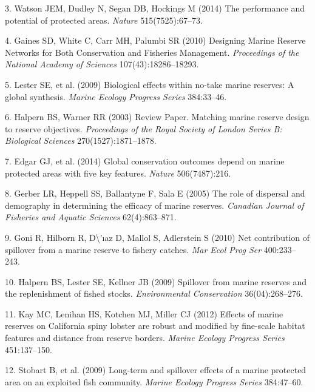 \documentclass[9pt,twocolumn,twoside,lineno]{pnas-new}
\begin{document}
\leavevmode\hypertarget{ref-watson2014b}{}%
3. Watson JEM, Dudley N, Segan DB, Hockings M (2014) The performance and
potential of protected areas. \emph{Nature} 515(7525):67--73.

\leavevmode\hypertarget{ref-gaines2010}{}%
4. Gaines SD, White C, Carr MH, Palumbi SR (2010) Designing Marine
Reserve Networks for Both Conservation and Fisheries Management.
\emph{Proceedings of the National Academy of Sciences}
107(43):18286--18293.

\leavevmode\hypertarget{ref-lester2009}{}%
5. Lester SE, et al. (2009) Biological effects within no-take marine
reserves: A global synthesis. \emph{Marine Ecology Progress Series}
384:33--46.

\leavevmode\hypertarget{ref-halpern2003}{}%
6. Halpern BS, Warner RR (2003) Review Paper. Matching marine reserve
design to reserve objectives. \emph{Proceedings of the Royal Society of
London Series B: Biological Sciences} 270(1527):1871--1878.

\leavevmode\hypertarget{ref-edgar2014}{}%
7. Edgar GJ, et al. (2014) Global conservation outcomes depend on marine
protected areas with five key features. \emph{Nature} 506(7487):216.

\leavevmode\hypertarget{ref-gerber2005}{}%
8. Gerber LR, Heppell SS, Ballantyne F, Sala E (2005) The role of
dispersal and demography in determining the efficacy of marine reserves.
\emph{Canadian Journal of Fisheries and Aquatic Sciences}
62(4):863--871.

\leavevmode\hypertarget{ref-goni2010}{}%
9. Goni R, Hilborn R, D\textbackslash'ıaz D, Mallol S, Adlerstein S
(2010) Net contribution of spillover from a marine reserve to fishery
catches. \emph{Mar Ecol Prog Ser} 400:233--243.

\leavevmode\hypertarget{ref-halpern2009}{}%
10. Halpern BS, Lester SE, Kellner JB (2009) Spillover from marine
reserves and the replenishment of fished stocks. \emph{Environmental
Conservation} 36(04):268--276.

\leavevmode\hypertarget{ref-kay2012}{}%
11. Kay MC, Lenihan HS, Kotchen MJ, Miller CJ (2012) Effects of marine
reserves on California spiny lobster are robust and modified by
fine-scale habitat features and distance from reserve borders.
\emph{Marine Ecology Progress Series} 451:137--150.

\leavevmode\hypertarget{ref-stobart2009}{}%
12. Stobart B, et al. (2009) Long-term and spillover effects of a marine
protected area on an exploited fish community. \emph{Marine Ecology
Progress Series} 384:47--60.
\end{document}
